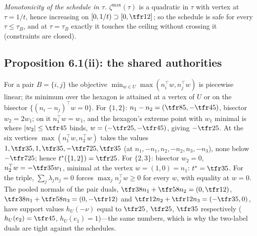 \emph{Monotonicity of the schedule in $\tau$.} $\zeta^{\max}(\tau)$ is a quadratic in $\tau$ with vertex at $\tau=1/t$, hence increasing on $[0,1/t)\supset[0,\tfr12]$; so the schedule is safe for every $\tau\le\tau_B$, and at $\tau=\tau_B$ exactly it touches the ceiling without crossing it (constraints are closed).

\subsection{Proposition 6.1(ii): the shared authorities}

For a pair $B=\{i,j\}$ the objective $\min_{w\in U}\max(n_i^\top w,n_j^\top w)$ is piecewise linear; its minimum over the hexagon is attained at a vertex of $U$ or on the bisector $\{(n_i-n_j)^\top w=0\}$. For $\{1,2\}$: $n_1-n_2=(\tfr85,-\tfr45)$, bisector $w_2=2w_1$; on it $n_1^\top w=w_1$, and the hexagon's extreme point with $w_1$ minimal is where $|w_2|\le\tfr45$ binds, $w=(-\tfr25,-\tfr45)$, giving $-\tfr25$. At the six vertices $\max(n_1^\top w,n_2^\top w)$ takes the values $1,\tfr35,1,\tfr35,-\tfr7{25},\tfr35$ (at $n_1,-n_1,n_2,-n_2,n_3,-n_3$), none below $-\tfr7{25}$; hence $t^\ast(\{1,2\})=\tfr25$. For $\{2,3\}$: bisector $w_2=0$, $n_2^\top w=-\tfr35w_1$, minimal at the vertex $w=(1,0)=n_1$: $t^\ast=\tfr35$. For the triple, $\sum_j\lambda_jn_j=0$ forces $\max_jn_j^\top w\ge0$ for every $w$, with equality at $w=0$. The pooled normals of the pair duals, $\tfr38n_1+\tfr58n_2=(0,\tfr12)$, $\tfr38n_1+\tfr58n_3=(0,-\tfr12)$ and $\tfr12n_2+\tfr12n_3=(-\tfr35,0)$, have support values $h_U(-\nu)$ equal to $\tfr25$, $\tfr25$, $\tfr35$ respectively ($h_U(e_2)=\tfr45$, $h_U(e_1)=1$)---the same numbers, which is why the two-label duals are tight against the schedules.
